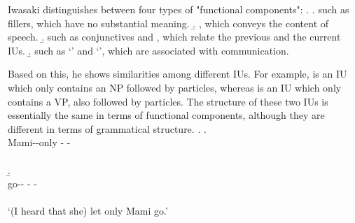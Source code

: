 Iwasaki distinguishes between four types of "functional components":
\ex.
 \a.  such as fillers, which have no substantial meaning.
 \b. , which conveys the content of speech.
 \b.  such as conjunctives and , which relate the previous and the current IUs.
 \b.  such as  `' and  `', which are associated with communication.

Based on this,
he shows similarities among different IUs.
For example, 
\Next[a] is an IU which only contains an NP followed by particles, whereas
\Next[b] is an IU which only contains a VP, also followed by particles.
The structure of these two IUs is essentially the same in terms of functional components,
although they are different in terms of grammatical structure.
%
\ex.
 \a.
   \\
        Mami--only - - \\
           \\
 \b.
   \\
         go-- - - \\
            \\
  \glt  `(I heard that she) let only Mami go.'

